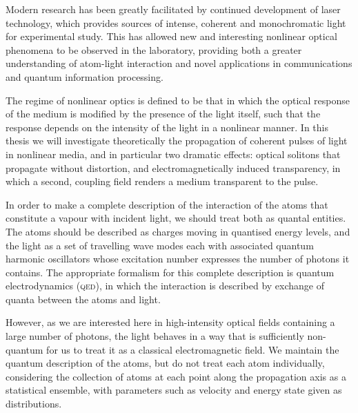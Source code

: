     Modern research has been greatly facilitated by continued development of
    laser technology, which provides sources of intense, coherent and
    monochromatic light for experimental study. This has allowed new and
    interesting nonlinear optical phenomena to be observed in the laboratory,
    providing both a greater understanding of atom-light interaction and novel
    applications in communications\cite{Kimble2008} and quantum information
    processing\cite{Lvovsky2009}.

    The regime of nonlinear optics is defined to be that in which the optical
    response of the medium is modified by the presence of the light itself, such
    that the response depends on the intensity of the light in a nonlinear
    manner.\cite{boyd2008nonlinear} In this thesis we will investigate
    theoretically the propagation of coherent pulses of light in nonlinear
    media, and in particular two dramatic effects: optical solitons that
    propagate without distortion, and electromagnetically induced transparency,
    in which a second, coupling field renders a medium transparent to the pulse.


    In order to make a complete description of the interaction of the atoms that
    constitute a vapour with incident light, we should treat both as quantal
    entities. The atoms should be described as charges moving in quantised
    energy levels, and the light as a set of travelling wave modes each with
    associated quantum harmonic oscillators whose excitation number expresses
    the number of photons it contains.\cite{scully1997quantum} The appropriate
    formalism for this complete description is quantum electrodynamics
    (\textsc{qed}), in which the interaction is described by exchange of quanta
    between the atoms and light.

    However, as we are interested here in high-intensity optical fields
    containing a large number of photons, the light behaves in a way that is
    sufficiently non-quantum for us to treat it as a classical electromagnetic
    field.\cite{jackson1998classical} We maintain the quantum description of the
    atoms, but do not treat each atom individually, considering the collection
    of atoms at each point along the propagation axis as a statistical ensemble,
    with parameters such as velocity and energy state given as distributions.

